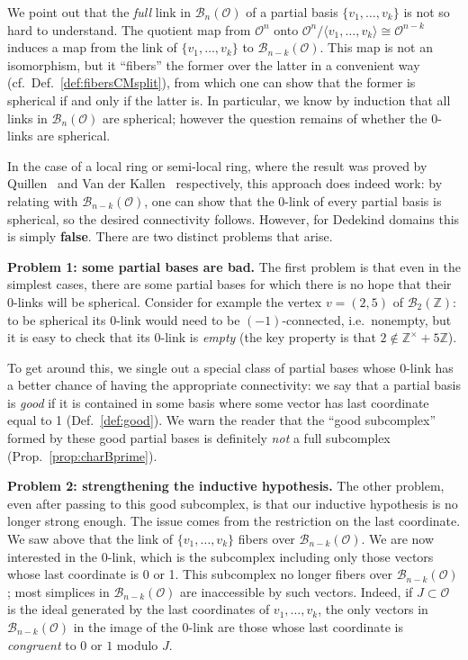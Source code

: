 \documentclass[11 pt]{article}
\theoremstyle{plain}
\theoremstyle{definition}
\numberwithin{equation}{section}
\newcommand\Z{\ensuremath{\mathbb{Z}}}
\newcommand\Span[1]{\ensuremath{\langle #1 \rangle}}
\newcommand{\para}[1]{\bigskip\noindent\textbf{#1.}}
\renewcommand{\O}{\mathcal{O}}
\newcommand\PartialBases{\ensuremath{\mathcal{B}}}
\newcommand{\PB}{\PartialBases}
\newcommand\iso{\cong}
\begin{document}
We point out that the \emph{full} link in $\PB_n(\O)$ of a partial basis $\{v_1,\ldots,v_k\}$ is not so hard to understand. The quotient map from $\O^n$ onto $\O^n/\Span{v_1,\ldots,v_k}\iso \O^{n-k}$ induces a map from the link  of $\{v_1,\ldots,v_k\}$ to $\PB_{n-k}(\O)$. This map is not an isomorphism, but it ``fibers'' the former over the latter in a convenient way (cf.\ Def.~\ref{def:fibersCMsplit}), from which one can show that the former is spherical if and only if the latter is. In particular, we know by induction that all links in $\PB_n(\O)$ are spherical; however the question remains of whether the 0-links are spherical.

In the case of a local ring or semi-local ring, where the result was proved by Quillen~\cite[Proposition~1]{Wagoner} and Van der Kallen~\cite[Theorem~2.6]{VanDerKallenStability} respectively, this approach does indeed work: by relating with $\PB_{n-k}(\O)$, one can show that the 0-link of every partial basis is spherical, so the desired connectivity follows. 
However, for Dedekind domains this is simply \textbf{false}. There are two distinct problems that arise.

\para{Problem 1: some partial bases are bad}
The first problem is that even in the simplest cases, there are some partial bases for which there is no hope that their 0-links will be spherical.  Consider for example the vertex $v=(2,5)$ of $\PB_2(\Z)$: to be spherical its 0-link would need to be $(-1)$-connected, i.e.\ nonempty, but it is easy to check that its 0-link is \emph{empty} (the key property is that $2\notin \Z^\times +5\Z$).

To get around this, we single out a special class of partial bases whose 0-link has a better chance of having the appropriate connectivity: we say that a partial basis is \emph{good} if it is contained in some basis where some vector has last coordinate equal to 1 (Def.~\ref{def:good}). We warn the reader that the ``good subcomplex'' formed by these good partial bases is definitely \emph{not} a full subcomplex (Prop.~\ref{prop:charBprime}).

\para{Problem 2: strengthening the inductive hypothesis}
The other problem, even after passing to this good subcomplex,  is that our inductive hypothesis is no longer strong enough. The issue comes from the restriction on the last coordinate.
We saw above that the link of $\{v_1,\ldots,v_k\}$ fibers over $\PB_{n-k}(\O)$. We are now interested in the 0-link, which is the subcomplex including only those vectors whose last coordinate is 0 or 1. This subcomplex no longer fibers over $\PB_{n-k}(\O)$; most simplices in $\PB_{n-k}(\O)$ are inaccessible by such vectors. Indeed, if $J\subset \O$ is the ideal generated by the last coordinates of $v_1,\ldots,v_k$, the only vectors in $\PB_{n-k}(\O)$ in the image of the 0-link are those whose last coordinate is \emph{congruent} to $0$ or $1$ modulo $J$.
\end{document}

